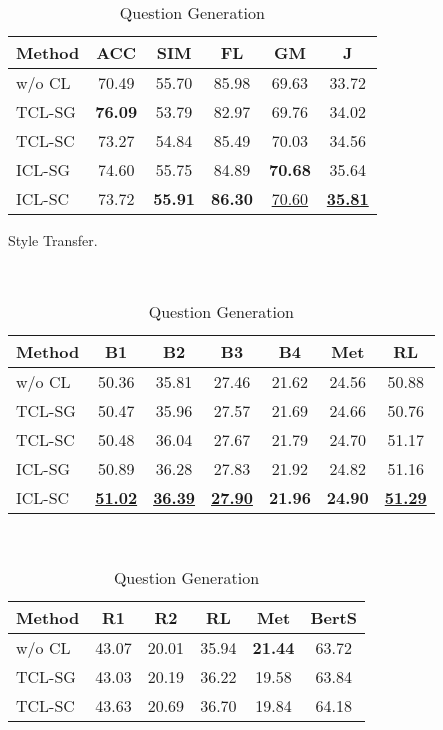 \begin{table}[th]
\begin{subtable}{\linewidth}
\begin{tabular}{lccccc}
			\hline
			{Method} &  {ACC} & {SIM} & {FL} & {GM} & {J}\\
			\hline
			w/o CL & 70.49 & 55.70 & 85.98 & 69.63 &33.72 \\
			TCL-SG & \textbf{76.09} & 53.79 & 82.97 & 69.76 & 34.02 \\
			\hline
			TCL-SC& 73.27 & 54.84 & 85.49 & 70.03 & 34.56\\
			ICL-SG & 74.60 & 55.75 & 84.89 & \textbf{70.68} & 35.64\\
			ICL-SC & 73.72 & \textbf{55.91} & \textbf{86.30} & \underline{{70.60}} & \underline{\textbf{35.81}} \\
			\hline
		\end{tabular}
		\caption{Style Transfer.}
		\label{tab:end2endst}
	\end{subtable}
	\\[5pt]
	\begin{subtable}{\linewidth}
		\scriptsize
		\centering
		\begin{tabular}{lcccccc}
			\hline
			{Method} & {B1} & {B2} & {B3} & {B4} & {Met} & {RL}\\
			\hline
			w/o CL & {50.36} & 35.81 & 27.46 & 21.62 & 24.56 & 50.88 \\
			TCL-SG &{50.47} & 35.96 & 27.57 & 21.69 & 24.66 & 50.76\\
			\hline
			TCL-SC & 50.48 & 36.04 & 27.67 & 21.79 & 24.70 & 51.17\\
			ICL-SG & 50.89 & 36.28 & 27.83 & 21.92 & 24.82 & 51.16\\
			ICL-SC &  \underline{\textbf{51.02}} & \underline{\textbf{36.39}} & \underline{\textbf{27.90}} & \textbf{21.96} & \textbf{24.90} & \underline{\textbf{51.29}} \\
			\hline
		\end{tabular}
		\caption{Question Generation}
		\label{tab:end2endqg}
	\end{subtable}
	\\[5pt]
	\begin{subtable}{\linewidth}
		\scriptsize
		\centering
		\begin{tabular}{lccccc}
			\hline
			{Method} & {R1} & {R2} & {RL} & {Met} & {BertS}\\
			\hline
			w/o CL &  43.07 & 20.01 & 35.94 & \textbf{21.44} & 63.72 \\
			TCL-SG & 43.03 & 20.19 & 36.22 & 19.58 & 63.84 \\
			\hline
			TCL-SC & 43.63 & 20.69 & 36.70 & 19.84 & 64.18 \\

\end{tabular}
\end{subtable}
\end{table}
